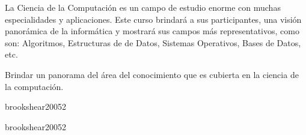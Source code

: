 \begin{syllabus}


\begin{justification}
La Ciencia de la Computación es un campo de estudio enorme con muchas especialidades y aplicaciones. Este curso brindará a sus participantes, una visión panorámica de la informática y mostrará sus campos más representativos, como son: Algoritmos, Estructuras de de Datos, Sistemas Operativos, Bases de Datos, etc.
\end{justification}

\begin{goals}
\item Brindar un panorama del área del conocimiento que es cubierta en la ciencia de la computación.
\end{goals}

\begin{outcomes}
\end{outcomes}

\begin{unit}{\DSTWODef}{brookshear2005}{2}
   \begin{topics}
      \item \DSTWOTopicLogica
      \item \DSTWOTopicConectivos
      \item \DSTWOTopicTablas
   \end{topics}

   \begin{unitgoals}
      \item \DSTWOObjONE
   \end{unitgoals}

\end{unit}

\begin{unit}{\PFONEDef}{brookshear2005}{2}

   \begin{topics}
      \item \PFONETopicSintaxis
      \item \PFONETopicVariables
      \item \PFONETopicEstructuras
   \end{topics}

   \begin{unitgoals}
      \item \PFONEObjONE
   \end{unitgoals}


\end{unit}
\end{syllabus}
